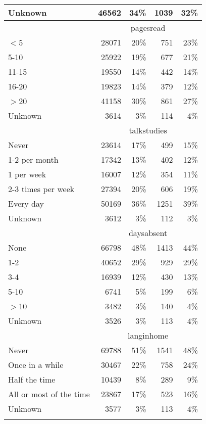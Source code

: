 \begin{longtable}{lrrrr}
  Unknown & 46562 & 34\% & 1039 & 32\% \\ 
   \hline & \multicolumn{4}{c}{pagesread} \\ \cline{2-5} $<$5 & 28071 & 20\% & 751 & 23\% \\ 
  5-10 & 25922 & 19\% & 677 & 21\% \\ 
  11-15 & 19550 & 14\% & 442 & 14\% \\ 
  16-20 & 19823 & 14\% & 379 & 12\% \\ 
  $>$20 & 41158 & 30\% & 861 & 27\% \\ 
  Unknown & 3614 & 3\% & 114 & 4\% \\ 
   \hline & \multicolumn{4}{c}{talkstudies} \\ \cline{2-5} Never & 23614 & 17\% & 499 & 15\% \\ 
  1-2 per month & 17342 & 13\% & 402 & 12\% \\ 
  1 per week & 16007 & 12\% & 354 & 11\% \\ 
  2-3 times per week & 27394 & 20\% & 606 & 19\% \\ 
  Every day & 50169 & 36\% & 1251 & 39\% \\ 
  Unknown & 3612 & 3\% & 112 & 3\% \\ 
   \hline & \multicolumn{4}{c}{daysabsent} \\ \cline{2-5} None & 66798 & 48\% & 1413 & 44\% \\ 
  1-2 & 40652 & 29\% & 929 & 29\% \\ 
  3-4 & 16939 & 12\% & 430 & 13\% \\ 
  5-10 & 6741 & 5\% & 199 & 6\% \\ 
  $>$10 & 3482 & 3\% & 140 & 4\% \\ 
  Unknown & 3526 & 3\% & 113 & 4\% \\ 
   \hline & \multicolumn{4}{c}{langinhome} \\ \cline{2-5} Never & 69788 & 51\% & 1541 & 48\% \\ 
  Once in a while & 30467 & 22\% & 758 & 24\% \\ 
  Half the time & 10439 & 8\% & 289 & 9\% \\ 
  All or most of the time & 23867 & 17\% & 523 & 16\% \\ 
  Unknown & 3577 & 3\% & 113 & 4\% \\ 
  \hline
\label{g4readingstudent}
\end{longtable}
